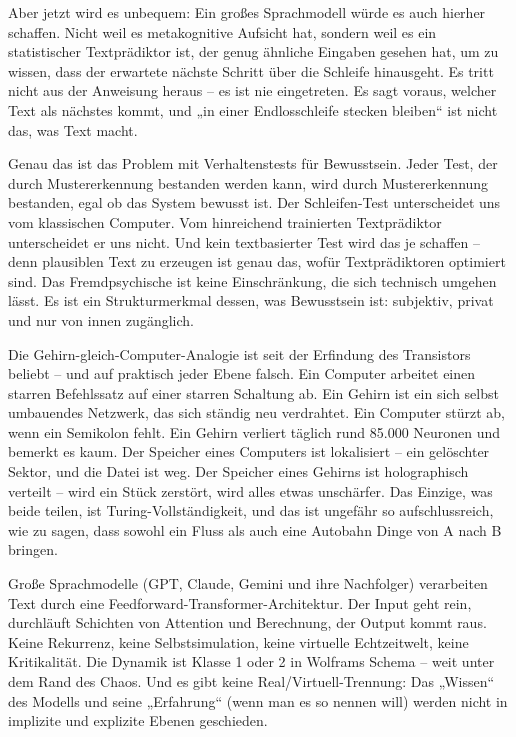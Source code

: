 \documentclass[11pt, twoside, openright]{book}
\begin{document}
Aber jetzt wird es unbequem: Ein großes Sprachmodell würde es auch hierher schaffen. Nicht weil es metakognitive Aufsicht hat, sondern weil es ein statistischer Textprädiktor ist, der genug ähnliche Eingaben gesehen hat, um zu wissen, dass der erwartete nächste Schritt über die Schleife hinausgeht. Es tritt nicht aus der Anweisung heraus -- es ist nie eingetreten. Es sagt voraus, welcher Text als nächstes kommt, und „in einer Endlosschleife stecken bleiben“ ist nicht das, was Text macht.

Genau das ist das Problem mit Verhaltenstests für Bewusstsein. Jeder Test, der durch Mustererkennung bestanden werden kann, wird durch Mustererkennung bestanden, egal ob das System bewusst ist. Der Schleifen-Test unterscheidet uns vom klassischen Computer. Vom hinreichend trainierten Textprädiktor unterscheidet er uns nicht. Und kein textbasierter Test wird das je schaffen -- denn plausiblen Text zu erzeugen ist genau das, wofür Textprädiktoren optimiert sind. Das Fremdpsychische ist keine Einschränkung, die sich technisch umgehen lässt. Es ist ein Strukturmerkmal dessen, was Bewusstsein ist: subjektiv, privat und nur von innen zugänglich.

Die Gehirn-gleich-Computer-Analogie ist seit der Erfindung des Transistors beliebt -- und auf praktisch jeder Ebene falsch. Ein Computer arbeitet einen starren Befehlssatz auf einer starren Schaltung ab. Ein Gehirn ist ein sich selbst umbauendes Netzwerk, das sich ständig neu verdrahtet. Ein Computer stürzt ab, wenn ein Semikolon fehlt. Ein Gehirn verliert täglich rund 85.000 Neuronen und bemerkt es kaum. Der Speicher eines Computers ist lokalisiert -- ein gelöschter Sektor, und die Datei ist weg. Der Speicher eines Gehirns ist holographisch verteilt -- wird ein Stück zerstört, wird alles etwas unschärfer. Das Einzige, was beide teilen, ist Turing-Vollständigkeit, und das ist ungefähr so aufschlussreich, wie zu sagen, dass sowohl ein Fluss als auch eine Autobahn Dinge von A nach B bringen.

Große Sprachmodelle (GPT, Claude, Gemini und ihre Nachfolger) verarbeiten Text durch eine Feedforward-Transformer-Architektur. Der Input geht rein, durchläuft Schichten von Attention und Berechnung, der Output kommt raus. Keine Rekurrenz, keine Selbstsimulation, keine virtuelle Echtzeitwelt, keine Kritikalität. Die Dynamik ist Klasse 1 oder 2 in Wolframs Schema -- weit unter dem Rand des Chaos. Und es gibt keine Real/Virtuell-Trennung: Das „Wissen“ des Modells und seine „Erfahrung“ (wenn man es so nennen will) werden nicht in implizite und explizite Ebenen geschieden.
\end{document}
